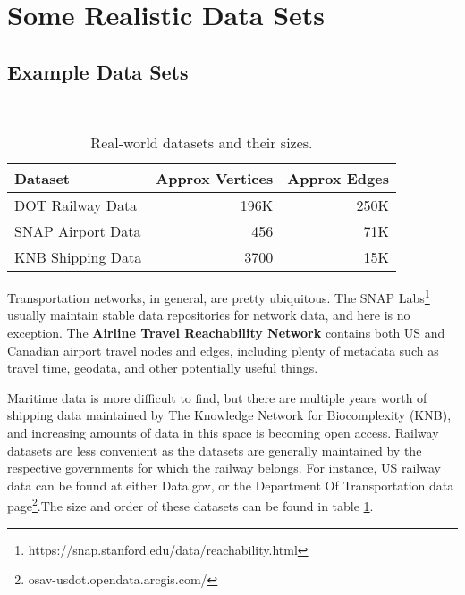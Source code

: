 \section{Some Realistic Data Sets}\label{sec:basic-datasets-\myInitials}

\subsection{Example Data Sets}

\begin{table}[h]
    \centering
    \caption{Real-world datasets and their sizes.}
    \\
    \begin{tabular}{lll}
        \hline
        \multicolumn{1}{|l|}{\textbf{Dataset}}  & \multicolumn{1}{l|}{\textbf{Approx Vertices}} & \multicolumn{1}{l|}{\textbf{Approx Edges}}   \\ \hline
        \multicolumn{1}{|l|}{DOT Railway Data}  & \multicolumn{1}{r|}{196K}           & \multicolumn{1}{r|}{250K} \\ \hline
        \multicolumn{1}{|l|}{SNAP Airport Data} & \multicolumn{1}{r|}{456}            & \multicolumn{1}{r|}{71K}       \\ \hline
        \multicolumn{1}{|l|}{KNB Shipping Data} & \multicolumn{1}{r|}{3700}     & \multicolumn{1}{r|}{15K}       \\ \hline
    \end{tabular}
    \label{table:potential_datasets}
\end{table}

Transportation networks, in general, are pretty ubiquitous. The SNAP Labs\footnote{\cite{snapnets}https://snap.stanford.edu/data/reachability.html} usually maintain stable data repositories for network data, and here is no exception. The \textbf{Airline Travel Reachability Network} contains both US and Canadian airport travel nodes and edges, including plenty of metadata such as travel time, geodata, and other potentially useful things. 

Maritime data is more difficult to find, but there are multiple years worth of shipping data maintained by The Knowledge Network for Biocomplexity (KNB)\cite{knb_data}, and increasing amounts of data in this space is becoming open access. Railway datasets are less convenient as the datasets are generally maintained by the respective governments for which the railway belongs. For instance, US railway data can be found at either Data.gov, or the Department Of Transportation data page\footnote{osav-usdot.opendata.arcgis.com/}.The size and order of these datasets can be found in table \ref{table:potential_datasets}.

